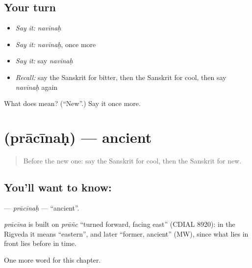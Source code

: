 \subsection*{Your turn}
\begin{itemize}
\raggedright
  \item \emph{Say it:} \emph{navīnaḥ}
  \item \emph{Say it:} \emph{navīnaḥ}, once more
  \item \emph{Say it:} say \emph{navīnaḥ}
  \item \emph{Recall:} say the Sanskrit for bitter, then the Sanskrit for cool, then say \emph{navīnaḥ} again
\end{itemize}

\begin{tcolorbox}[breakable,colback=teal!4,colframe=teal!35!black,title={Before you move on}]
What does  mean? (\textquotedblleft{}New\textquotedblright{}.) Say it once more.
\end{tcolorbox}
\section[\texorpdfstring{\sk{प्राचीनः} (prācīnaḥ)}{प्राचीनः (prācīnaḥ)}]{ (prācīnaḥ) — ancient}

\label{lesson:SA-C129-pracinah}



\begin{quote}
Before the new one: say the Sanskrit for cool, then the Sanskrit for new.
\end{quote}

\subsection*{You'll want to know: }
\textbf{} — \emph{prācīnaḥ} — \textquotedblleft{}ancient\textquotedblright{}.

\begin{cousinweb}
\emph{prācīna} is built on \emph{prāñc} \textquotedblleft{}turned forward, facing east\textquotedblright{} (CDIAL 8920): in the Rigveda it means \textquotedblleft{}eastern\textquotedblright{}, and later \textquotedblleft{}former, ancient\textquotedblright{} (MW), since what lies in front lies before in time.
\end{cousinweb}

\begin{grammarlens}[title={What you've built}]
One more word for this chapter.
\end{grammarlens}

